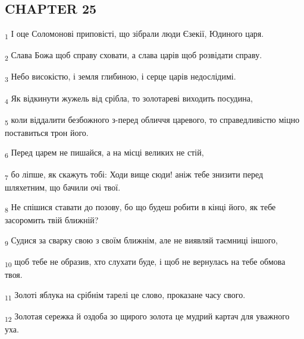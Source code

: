 \subsection{CHAPTER 25}
\begin{tcolorbox}
\textsubscript{1} І оце Соломонові приповісті, що зібрали люди Єзекії, Юдиного царя.
\end{tcolorbox}
\begin{tcolorbox}
\textsubscript{2} Слава Божа щоб справу сховати, а слава царів щоб розвідати справу.
\end{tcolorbox}
\begin{tcolorbox}
\textsubscript{3} Небо високістю, і земля глибиною, і серце царів недослідимі.
\end{tcolorbox}
\begin{tcolorbox}
\textsubscript{4} Як відкинути жужель від срібла, то золотареві виходить посудина,
\end{tcolorbox}
\begin{tcolorbox}
\textsubscript{5} коли віддалити безбожного з-перед обличчя царевого, то справедливістю міцно поставиться трон його.
\end{tcolorbox}
\begin{tcolorbox}
\textsubscript{6} Перед царем не пишайся, а на місці великих не стій,
\end{tcolorbox}
\begin{tcolorbox}
\textsubscript{7} бо ліпше, як скажуть тобі: Ходи вище сюди! аніж тебе знизити перед шляхетним, що бачили очі твої.
\end{tcolorbox}
\begin{tcolorbox}
\textsubscript{8} Не спішися ставати до позову, бо що будеш робити в кінці його, як тебе засоромить твій ближній?
\end{tcolorbox}
\begin{tcolorbox}
\textsubscript{9} Судися за сварку свою з своїм ближнім, але не виявляй таємниці іншого,
\end{tcolorbox}
\begin{tcolorbox}
\textsubscript{10} щоб тебе не образив, хто слухати буде, і щоб не вернулась на тебе обмова твоя.
\end{tcolorbox}
\begin{tcolorbox}
\textsubscript{11} Золоті яблука на срібнім тарелі це слово, проказане часу свого.
\end{tcolorbox}
\begin{tcolorbox}
\textsubscript{12} Золотая сережка й оздоба зо щирого золота це мудрий картач для уважного уха.
\end{tcolorbox}
